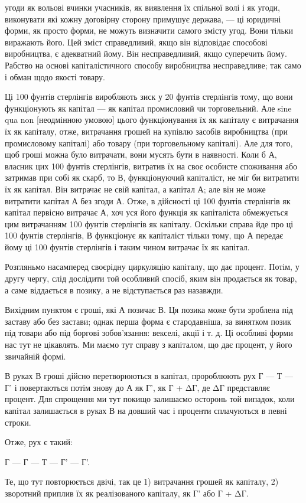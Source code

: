 \parcont{}  %
угоди як вольові вчинки учасників, як виявлення їх спільної
волі і як угоди, виконувати які кожну договірну сторону примушує
держава, — ці юридичні форми, як просто форми, не можуть
визначити самого змісту угод. Вони тільки виражають його.
Цей зміст справедливий, якщо він відповідає способові виробництва,
є адекватний йому. Він несправедливий, якщо суперечить
йому. Рабство на основі капіталістичного способу виробництва
несправедливе; так само і обман щодо якості товару.

Ці 100 фунтів стерлінгів виробляють зиск у 20 фунтів стерлінгів
тому, що вони функціонують як капітал — як капітал
промисловий чи торговельний. Але sine qua non [неодмінною
умовою] цього функціонування їх як капіталу є витрачання їх
як капіталу, отже, витрачання грошей на купівлю засобів виробництва
(при промисловому капіталі) або товару (при торговельному
капіталі). Але для того, щоб гроші можна було витрачати,
вони мусять бути в наявності. Коли б А, власник цих
100 фунтів стерлінгів, витратив їх на своє особисте споживання
або затримав при собі як скарб, то В, функціонуючий капіталіст,
не міг би витратити їх як капітал. Він витрачає не свій
капітал, а капітал А; але він не може витратити капітал А без
згоди А. Отже, в дійсності ці 100 фунтів стерлінгів як капітал
первісно витрачає А, хоч уся його функція як капіталіста обмежується
цим витрачанням 100 фунтів стерлінгів як капіталу.
Оскільки справа йде про ці 100 фунтів стерлінгів, В функціонує
як капіталіст тільки тому, що А передає йому ці 100 фунтів
стерлінгів і таким чином витрачає їх як капітал.

Розгляньмо насамперед своєрідну циркуляцію капіталу, що
дає процент. Потім, у другу чергу, слід дослідити той особливий
спосіб, яким він продається як товар, а саме віддається
в позику, а не відступається раз назавжди.

Вихідним пунктом є гроші, які А позичає В. Ця позика може
бути зроблена під заставу або без застави; однак перша форма є
стародавніша, за винятком позик під товари або під боргові
зобов’язання: векселі, акції і т. д. Ці особливі форми нас тут
не цікавлять. Ми маємо тут справу з капіталом, що дає процент,
у його звичайній формі.

В руках В гроші дійсно перетворюються в капітал, пророблюють
рух Г — Т — Г' і повертаються потім знову до А як Г',
як Г + ΔГ, де ΔГ представляє процент. Для спрощення ми тут
покищо залишаємо осторонь той випадок, коли капітал залишається
в руках В на довший час і проценти сплачуються
в певні строки.

Отже, рух є такий:

Г — Г — Т — Г' — Г'.

Те, що тут повторюється двічі, так це 1) витрачання грошей
як капіталу, 2) зворотний приплив їх як реалізованого
капіталу, як Г' або Г + ΔГ.
